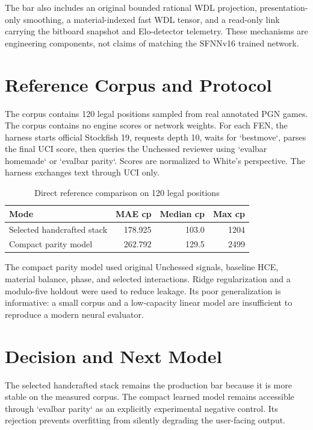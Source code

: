 \documentclass[10pt,conference]{IEEEtran}
\begin{document}
The bar also includes an original bounded rational WDL projection, presentation-only smoothing, a material-indexed fast WDL tensor, and a read-only link carrying the bitboard snapshot and Elo-detector telemetry. These mechanisms are engineering components, not claims of matching the SFNNv16 trained network.

\section{Reference Corpus and Protocol}
The corpus contains 120 legal positions sampled from real annotated PGN games. The corpus contains no engine scores or network weights. For each FEN, the harness starts official Stockfish 19, requests depth 10, waits for `bestmove`, parses the final UCI score, then queries the Unchessed reviewer using `evalbar homemade` or `evalbar parity`. Scores are normalized to White's perspective. The harness exchanges text through UCI only.

\begin{table}[t]
\centering
\caption{Direct reference comparison on 120 legal positions}
\label{tab:results}
\begin{tabular}{lrrr}
\toprule
Mode & MAE cp & Median cp & Max cp\\
\midrule
Selected handcrafted stack & 178.925 & 103.0 & 1204\\
Compact parity model & 262.792 & 129.5 & 2499\\
\bottomrule
\end{tabular}
\end{table}

The compact parity model used original Unchessed signals, baseline HCE, material balance, phase, and selected interactions. Ridge regularization and a modulo-five holdout were used to reduce leakage. Its poor generalization is informative: a small corpus and a low-capacity linear model are insufficient to reproduce a modern neural evaluator.

\section{Decision and Next Model}
The selected handcrafted stack remains the production bar because it is more stable on the measured corpus. The compact learned model remains accessible through `evalbar parity` as an explicitly experimental negative control. Its rejection prevents overfitting from silently degrading the user-facing output.
\end{document}
